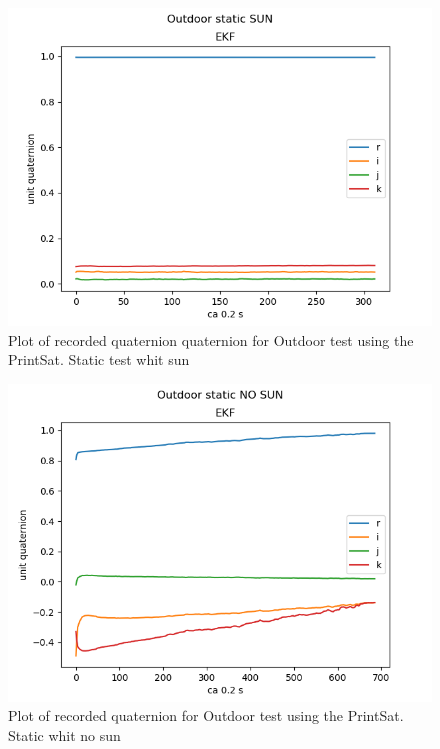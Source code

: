\begin{figure}[tbp]
	\centering
	\includegraphics[width=1\columnwidth]{./Pictures/run3OutdoorStaticSUN}
	\caption{Plot of recorded quaternion quaternion for Outdoor test using the PrintSat. Static test whit sun}
	\label{fig:Outdoor3RotNoSun}
\end{figure}

\begin{figure}[tbp]
	\centering
	\includegraphics[width=1\columnwidth]{./Pictures/run3OutdoorStaticNOSUN}
	\caption{Plot of recorded quaternion for Outdoor test using the PrintSat. Static whit  no sun}
	\label{fig:Outdoor3RotNoSun}
\end{figure}         

